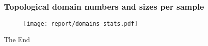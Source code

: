 \documentclass{beamer}
\begin{document}

\begin{frame}
\frametitle{Topological domain numbers and sizes per sample}
\begin{figure}
\texttt{[image: report/domains-stats.pdf]}
\end{figure}
\end{frame}


\begin{frame}
\Huge{\centerline{The End}}
\end{frame}

\end{document}
